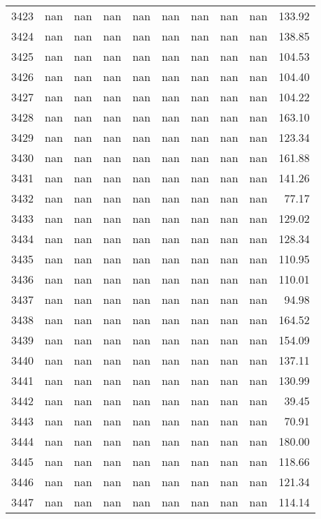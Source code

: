 \begin{tabular}{lrrrrrrrrr}
3423 & nan & nan & nan & nan & nan & nan & nan & nan & 133.92 \\
3424 & nan & nan & nan & nan & nan & nan & nan & nan & 138.85 \\
3425 & nan & nan & nan & nan & nan & nan & nan & nan & 104.53 \\
3426 & nan & nan & nan & nan & nan & nan & nan & nan & 104.40 \\
3427 & nan & nan & nan & nan & nan & nan & nan & nan & 104.22 \\
3428 & nan & nan & nan & nan & nan & nan & nan & nan & 163.10 \\
3429 & nan & nan & nan & nan & nan & nan & nan & nan & 123.34 \\
3430 & nan & nan & nan & nan & nan & nan & nan & nan & 161.88 \\
3431 & nan & nan & nan & nan & nan & nan & nan & nan & 141.26 \\
3432 & nan & nan & nan & nan & nan & nan & nan & nan & 77.17 \\
3433 & nan & nan & nan & nan & nan & nan & nan & nan & 129.02 \\
3434 & nan & nan & nan & nan & nan & nan & nan & nan & 128.34 \\
3435 & nan & nan & nan & nan & nan & nan & nan & nan & 110.95 \\
3436 & nan & nan & nan & nan & nan & nan & nan & nan & 110.01 \\
3437 & nan & nan & nan & nan & nan & nan & nan & nan & 94.98 \\
3438 & nan & nan & nan & nan & nan & nan & nan & nan & 164.52 \\
3439 & nan & nan & nan & nan & nan & nan & nan & nan & 154.09 \\
3440 & nan & nan & nan & nan & nan & nan & nan & nan & 137.11 \\
3441 & nan & nan & nan & nan & nan & nan & nan & nan & 130.99 \\
3442 & nan & nan & nan & nan & nan & nan & nan & nan & 39.45 \\
3443 & nan & nan & nan & nan & nan & nan & nan & nan & 70.91 \\
3444 & nan & nan & nan & nan & nan & nan & nan & nan & 180.00 \\
3445 & nan & nan & nan & nan & nan & nan & nan & nan & 118.66 \\
3446 & nan & nan & nan & nan & nan & nan & nan & nan & 121.34 \\
3447 & nan & nan & nan & nan & nan & nan & nan & nan & 114.14 \\

\end{tabular}
